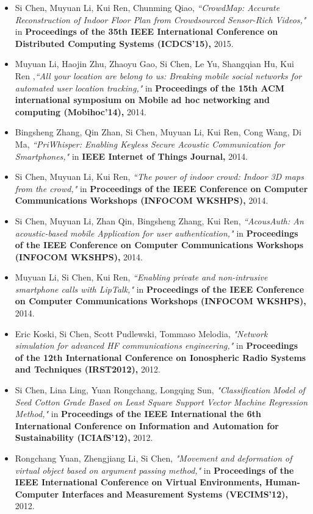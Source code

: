 \documentclass[a4paper, 11pt]{article}
\makeatletter
\newcommand{\ressection}[1]
{\fcolorbox{black}{shadecolor}{\vbox{\hsize 0.98\textwidth \textbf{\mbox{~}{\@ \large #1} \vphantom{p\^{E}}}}}}
\makeatother
\begin{document}
\ressection{Publications}
\begin{itemize}
\item 
Si Chen, Muyuan Li, Kui Ren, Chunming Qiao, \emph{``CrowdMap: Accurate Reconstruction of Indoor Floor Plan from Crowdsourced Sensor-Rich Videos,"} in \textbf{Proceedings of the 35th IEEE International Conference on Distributed Computing Systems (ICDCS'15),} 2015.
\item 
Muyuan Li, Haojin Zhu, Zhaoyu Gao, Si Chen, Le Yu, Shangqian Hu, Kui Ren ,\emph{``All your location are belong to us: Breaking mobile social networks for automated user location tracking,"} in \textbf{Proceedings of the 15th ACM international symposium on Mobile ad hoc networking and computing (Mobihoc'14),} 2014.
\item 
Bingsheng Zhang, Qin Zhan, Si Chen, Muyuan Li, Kui Ren, Cong Wang, Di Ma, \emph{``PriWhisper: Enabling Keyless Secure Acoustic Communication for Smartphones,"} in \textbf{IEEE Internet of Things Journal,} 2014.
\item 
Si Chen, Muyuan Li, Kui Ren, \emph{``The power of indoor crowd: Indoor 3D maps from the crowd,"} in \textbf{Proceedings of the IEEE Conference on Computer Communications Workshops (INFOCOM WKSHPS),} 2014.
\item 
Si Chen, Muyuan Li, Zhan Qin, Bingsheng Zhang, Kui Ren, \emph{``AcousAuth: An acoustic-based mobile Application for user authentication,"} in \textbf{Proceedings of the IEEE Conference on Computer Communications Workshops (INFOCOM WKSHPS),} 2014.
\item 
Muyuan Li, Si Chen, Kui Ren, \emph{``Enabling private and non-intrusive smartphone calls with LipTalk,"} in \textbf{Proceedings of the IEEE Conference on Computer Communications Workshops (INFOCOM WKSHPS),}  2014.
\item 
Eric Koski, Si Chen, Scott Pudlewski, Tommaso Melodia, \emph{"Network simulation for advanced HF communications engineering,"} in \textbf{Proceedings of the 12th International Conference on Ionospheric Radio Systems and Techniques (IRST2012),} 2012.
\item 
Si Chen, Lina Ling, Yuan Rongchang, Longqing Sun, \emph{"Classification Model of Seed Cotton Grade Based on Least Square Support Vector Machine Regression Method,"} in \textbf{Proceedings of the IEEE International the 6th International Conference on Information and Automation for Sustainability (ICIAfS'12),} 2012.
\item 
Rongchang Yuan, Zhengjiang Li, Si Chen, \emph{"Movement and deformation of virtual object based on argument passing method,"} in \textbf{Proceedings of the IEEE International Conference on Virtual Environments, Human-Computer Interfaces and Measurement Systems (VECIMS'12),} 2012.

\end{itemize}
\end{document}
